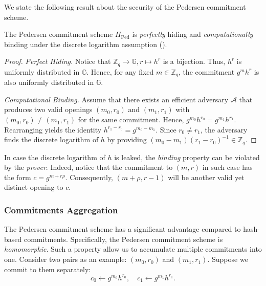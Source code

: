 \documentclass[../../book]{subfiles}
\begin{document}
We state the following result about the security of the Pedersen commitment scheme.

\begin{lemma}\label{lemma:pedersen-hiding-binding}
    The Pedersen commitment scheme $\Pi_{\text{Ped}}$ is \emph{perfectly} hiding and \emph{computationally} binding under the discrete logarithm assumption ().
\end{lemma}

\begin{proof}
    \emph{Perfect Hiding.} Notice that $\mathbb{Z}_q \to \mathbb{G}, r \mapsto h^r$ is a bijection. Thus, $h^r$ is uniformly distributed in $\mathbb{G}$.
    Hence, for any fixed $m \in \mathbb{Z}_q$, the commitment $g^mh^r$ is also uniformly distributed in $\mathbb{G}$.

    \emph{Computational Binding.} Assume that there exists an efficient adversary $\mathcal{A}$ that produces two valid openings $(m_0,r_0)$ and $(m_1,r_1)$ with $(m_0,r_0) \neq (m_1,r_1)$ for the same commitment. 
    Hence, $g^{m_0}h^{r_0} = g^{m_1}h^{r_1}$.
    Rearranging yields the identity $h^{r_1-r_0} = g^{m_0-m_1}$. 
    Since $r_0 \neq r_1$, the adversary finds the discrete logarithm of $h$ by providing $(m_0-m_1)(r_1-r_0)^{-1} \in \mathbb{Z}_q$.
\end{proof}

\begin{remark}
    In case the discrete logarithm of $h$ is leaked, the \emph{binding} property can be violated by the \emph{prover}.
    Indeed, notice that the commitment to $(m,r)$ in such case has the form $c = g^{m + r\rho}$.
    Consequently, $(m+\rho, r-1)$ will be another valid yet distinct opening to $c$.
\end{remark}

\subsubsection{Commitments Aggregation}

The Pedersen commitment scheme has a significant advantage compared to hash-based commitments.
Specifically, the Pedersen commitment scheme is \textit{homomorphic}.
Such a property allow us to accumulate multiple commitments into one.
Consider two pairs as an example: $(m_0, r_0)$ and $(m_1, r_1)$.
Suppose we commit to them separately:
\begin{equation*}
    c_0 \gets g^{m_0}h^{r_0}, \quad c_1 \gets g^{m_1}h^{r_1}.
\end{equation*}
\end{document}
